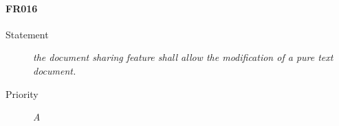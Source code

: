 \paragraph{FR016}
\begin{description}
  \item [Statement] 
  \textit{ the document sharing feature shall allow the modification of a pure text document.}
\item [Priority] \textit{A}
\end{description}
